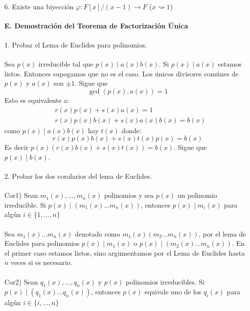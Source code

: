 \documentclass{article}
\begin{document}
\\
6. Existe una biyección $\varphi: F[x]/(x-1) \to F$ ($x \rightsquigarrow 1$)
\\
\\
\textbf{E. Demostración del Teorema de Factorización Única}
\\
\\
1. Probar el Lema de Euclides para polinomios.
\\
\\
Sea $p(x)$ irreducible tal que $p(x) \mid a(x)b(x)$. Si $p(x) \mid a(x)$ estamos listos. Entonces supogamos que no es el caso. Los únicos divisores comúnes de $p(x)$ y $a(x)$ son $\pm 1$. Sigue que
\begin{equation*}
    \gcd (p(x),a(x)) = 1
\end{equation*}
Esto es equivalente a:
\begin{equation*}
\begin{aligned}
    &r(x)p(x)+s(x)a(x)=1 \\
    &r(x)p(x)b(x)+s(x)a(x)b(x)=b(x)
\end{aligned}
\end{equation*}
como $p(x) \mid a(x)b(x)$ hay $t(x)$ donde:
\begin{equation*}
    r(x)p(x)b(x)+s(x)t(x)p(x)=b(x)
\end{equation*}
Es decir $p(x)\left( r(x)b(x)+s(x)t(x) \right) = b(x)$. Sigue que $p(x) \mid b(x)$.
\\
\\
2. Probar los dos corolarios del lema de Euclides.
\\
\\
Cor1) Sean $m_{1}(x),\dots,m_{n}(x)$ polinomios y sea $p(x)$ un polinomio irreducible. Si $p(x) \mid (m_{1}(x)\dots m_{n}(x))$, entonces $p(x) \mid m_{i}(x)$ para algún $i \in \{1,\dots,n \}$
\\
\\
Sea $m_{1}(x)\dots m_{n}(x)$ denotado como $m_{1}(x)(m_{2}\dots m_{n}(x))$, por el lema de Euclides para polinomios $p(x) \mid m_{1}(x)$ o $p(x) \mid (m_{2}(x)\dots m_{n}(x))$. En el primer caso estamos listos, sino argumentamos por el Lema de Euclides hasta $n$ veces si es necesario.
\\
\\
Cor2) Sean $q_{1}(x),\dots,q_{n}(x)$ y $p(x)$ polinomios irreducibles. Si $p(x) \mid (q_{1}(x) \dots q_{n}(x))$, entonces $p(x)$ equivale uno de los $q_{i}(x)$ para algún $i \in \{ i,\dots,n\}$
\\
\\
\end{document}
